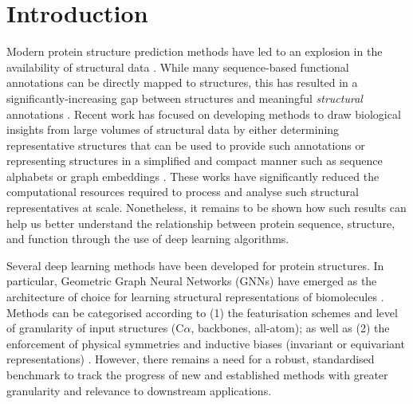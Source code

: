 \section{Introduction}

Modern protein structure prediction methods have led to an explosion in the availability of structural data \citep{jumper2021highly, baek2021accurate}. While many sequence-based functional annotations can be directly mapped to structures, this has resulted in a significantly-increasing gap between structures and meaningful \emph{structural} annotations \citep{Varadi2021}. Recent work has focused on developing methods to draw biological insights from large volumes of structural data by either determining representative structures that can be used to provide such annotations \citep{holm2022dali} or representing structures in a simplified and compact manner such as sequence alphabets \citep{vanKempen2023} or graph embeddings \citep{greener2022fast}. These works have significantly reduced the computational resources required to process and analyse such structural representatives at scale. Nonetheless, it remains to be shown how such results can help us better understand the relationship between protein sequence, structure, and function through the use of deep learning algorithms.

Several deep learning methods have been developed for protein structures. In particular, Geometric Graph Neural Networks (GNNs) \citep{duval2023hitchhiker} have emerged as the architecture of choice for learning structural representations of biomolecules \citep{schutt2018schnet, Gasteiger2020directional, jing2020learning, schutt2021equivariantmp, morehead2022geometric, zhang2023protein}.
Methods can be categorised according to (1) the featurisation schemes and level of granularity of input structures (C$\alpha$, backbones, all-atom); as well as (2) the enforcement of physical symmetries and inductive biases (invariant or equivariant representations) \citep{joshi2023expressive}.
However, there remains a need for a robust, standardised benchmark to track the progress of new and established methods with greater granularity and relevance to downstream applications. 

